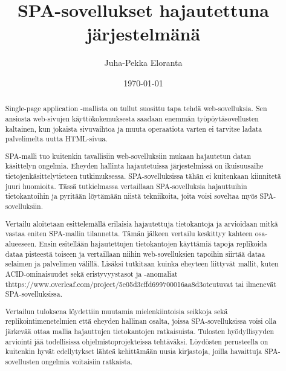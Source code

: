 \documentclass[finnish,twoside,censored,csm,sw-track-2018]{HYthesisML}
\title{SPA-sovellukset hajautettuna järjestelmänä}
\author{Juha-Pekka Eloranta}
\date{\today}
\begin{document}
\maketitle

\begin{abstract}

Single-page application -mallista on tullut suosittu tapa tehdä web-sovelluksia. Sen ansiosta web-sivujen käyttökokemuksesta saadaan enemmän työpöytäsovellusten kaltainen, kun jokaista sivuvaihtoa ja muuta operaatiota varten ei tarvitse ladata palvelimelta uutta HTML-sivua.

SPA-malli tuo kuitenkin tavallisiin web-sovelluksiin mukaan hajautetun datan käsittelyn ongelmia. Eheyden hallinta hajautetuissa järjestelmissä on ikuisuusaihe tietojenkäsittelytieteen tutkimuksessa. SPA-sovelluksissa tähän ei kuitenkaan kiinnitetä juuri huomioita. Tässä tutkielmassa vertaillaan SPA-sovelluksia hajauttuihin tietokantoihin ja pyritään löytämään niistä tekniikoita, joita voisi soveltaa myös SPA-sovelluksiin.

Vertailu aloitetaan esittelemällä erilaisia hajautettuja tietokantoja ja arvioidaan mitkä vastaa eniten SPA-mallin tilannetta. Tämän jälkeen vertailu keskittyy kahteen osa-alueeseen. Ensin esitellään hajautettujen tietokantojen käyttämiä tapoja replikoida dataa pisteestä toiseen ja vertaillaan niihin web-sovelluksien tapoihin siirtää dataa selaimen ja palvelimen välillä. Lisäksi tutkitaan kuinka eheyteen liittyvät mallit, kuten ACID-ominaisuudet sekä eristyvyystasot ja -anomaliat thttps://www.overleaf.com/project/5e05d3cffd699700016aa8d3oteutuvat tai ilmenevät SPA-sovelluksissa.

Vertailun tuloksena löydettiin muutamia mielenkiintoisia seikkoja sekä replikointimenetelmien että eheyden hallinan osalta, joissa SPA-sovelluksissa voisi olla järkevää ottaa mallia hajauttujen tietokantojen ratkaisuista. Tulosten hyödyllisyyden arviointi jää todellisissa ohjelmistoprojekteissa tehtäväksi. Löydösten perusteella on kuitenkin hyvät edellytykset lähteä kehittämään uusia kirjastoja, joilla havaittuja SPA-sovellusten ongelmia voitaisiin ratkaista.

\end{abstract}
\end{document}
